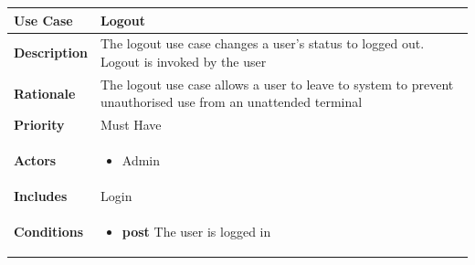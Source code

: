 \begin{tabular}{|l|p{8.5cm}|}
\hline \textbf{Use Case} & Logout \\
\hline \textbf{Description} & The logout use case changes a user's status to logged out. Logout is invoked by the user \\
\hline \textbf{Rationale} & The logout use case allows a user to leave to system to prevent unauthorised use from an unattended terminal \\
\hline \textbf{Priority} & Must Have \\ 
\hline \textbf{Actors} & 
\begin{itemize}
 \item Admin
\end{itemize} \\
\hline \textbf{Includes} & Login \\
\hline \textbf{Conditions} & 
\begin{itemize}
 \item \textbf{post} The user is logged in
\end{itemize} \\ \hline
\end{tabular}


